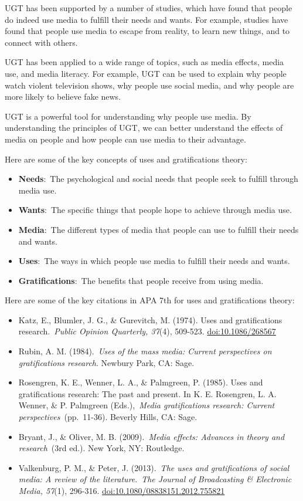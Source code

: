 \documentclass[
]{book}
\begin{document}
UGT has been supported by a number of studies, which have found that people do indeed use media to fulfill their needs and wants. For example, studies have found that people use media to escape from reality, to learn new things, and to connect with others.

UGT has been applied to a wide range of topics, such as media effects, media use, and media literacy. For example, UGT can be used to explain why people watch violent television shows, why people use social media, and why people are more likely to believe fake news.

UGT is a powerful tool for understanding why people use media. By understanding the principles of UGT, we can better understand the effects of media on people and how people can use media to their advantage.

Here are some of the key concepts of uses and gratifications theory:

\begin{itemize}
\item
  \textbf{Needs}:~The psychological and social needs that people seek to fulfill through media use.
\item
  \textbf{Wants}:~The specific things that people hope to achieve through media use.
\item
  \textbf{Media}:~The different types of media that people can use to fulfill their needs and wants.
\item
  \textbf{Uses}:~The ways in which people use media to fulfill their needs and wants.
\item
  \textbf{Gratifications}:~The benefits that people receive from using media.
\end{itemize}

Here are some of the key citations in APA 7th for uses and gratifications theory:

\begin{itemize}
\item
  Katz, E., Blumler, J. G., \& Gurevitch, M. (1974). Uses and gratifications research.~\emph{Public Opinion Quarterly, 37}(4), 509-523. \url{doi:10.1086/268567}
\item
  Rubin, A. M. (1984).~\emph{Uses of the mass media: Current perspectives on gratifications research}. Newbury Park, CA: Sage.
\item
  Rosengren, K. E., Wenner, L. A., \& Palmgreen, P. (1985). Uses and gratifications research: The past and present. In K. E. Rosengren, L. A. Wenner, \& P. Palmgreen (Eds.),~\emph{Media gratifications research: Current perspectives}~(pp.~11-36). Beverly Hills, CA: Sage.
\item
  Bryant, J., \& Oliver, M. B. (2009).~\emph{Media effects: Advances in theory and research}~(3rd ed.). New York, NY: Routledge.
\item
  Valkenburg, P. M., \& Peter, J. (2013).~\emph{The uses and gratifications of social media: A review of the literature}.~\emph{The Journal of Broadcasting \& Electronic Media, 57}(1), 296-316. \url{doi:10.1080/08838151.2012.755821}
\end{itemize}
\end{document}
